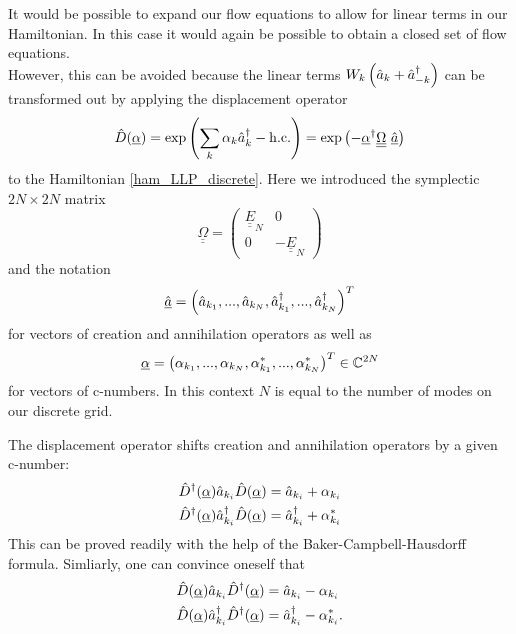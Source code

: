 It would be possible to expand our flow equations to allow for linear terms in our Hamiltonian. In this case it would again be possible to obtain a closed set of flow equations. \\
However, this can be avoided because the linear terms  $W_k \left(\hat a_{ k}+\hat a^\dagger_{- k}\right)$ can be transformed out by applying the displacement operator 
\begin{equation}
\hat D(\underline\alpha)=\exp\left(\sum_k\alpha_k\CR_k-\mathrm{h.c.}\right)=\exp\left(-\underline\alpha^\dagger{\underline{\underline\Omega}}\ \underline{\hat a}\right)
\end{equation}
to the Hamiltonian \ref{ham_LLP_discrete}. Here we introduced the symplectic $2N\times2N$ matrix
\begin{equation}\label{symplectic_matrix}
{\underline{\underline\Omega}}=\begin{pmatrix}\underline{\underline E}_N & 0\\ 0 & -\underline{\underline E}_N\end{pmatrix}
\end{equation}
and the notation
\begin{equation}\label{cr_an_vector}
\underline{\hat a} = \left(\hat a_{k_1},...,\hat a_{k_N},\hat a^\dagger_{k_1},...,\hat a^\dagger_{k_N}\right)^T
\end{equation}
for vectors of creation and annihilation operators as well as
\begin{equation}\label{c-number_vector}
\underline\alpha = \left(\alpha_{k_1},...,\alpha_{k_N},\alpha_{k_1}^*,...,\alpha_{k_N}^*\right)^T\in\mathbb{C}^{2N}
\end{equation}
for vectors of c-numbers. In this context $N$ is equal to the number of modes on our discrete grid.\par
The displacement operator shifts creation and annihilation operators by a given c-number:
\begin{subequations}
\begin{align}
\hat D^\dagger(\underline \alpha)\hat a_{k_i}\hat D(\underline\alpha)&=\hat a_{k_i}+\alpha_{k_i}\\
\hat D^\dagger(\underline \alpha)\hat a^\dagger_{k_i}\hat D(\underline\alpha)&=\hat a^\dagger_{k_i}+\alpha_{k_i}^*
\end{align}
\end{subequations}
This can be proved readily with the help of the Baker-Campbell-Hausdorff formula.
Simliarly, one can convince oneself that
\begin{subequations}
\begin{align}
\hat D(\underline \alpha)\hat a_{k_i}\hat D^\dagger(\underline\alpha)&=\hat a_{k_i}-\alpha_{k_i}\\
\hat D(\underline \alpha)\hat a^\dagger_{k_i}\hat D^\dagger(\underline\alpha)&=\hat a^\dagger_{k_i}-\alpha_{k_i}^*.
\end{align}
\end{subequations}
